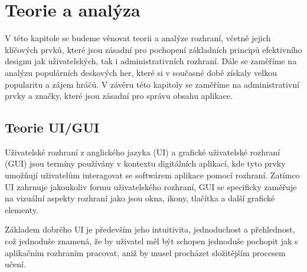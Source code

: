 \chapter{Teorie a analýza}
\label{ch:theory_and_analysis}
V této kapitole se budeme věnovat teorii a analýze rozhraní, včetně jejich klíčových prvků, které jsou zásadní pro pochopení základních principů efektivního designu jak uživatelských, tak i administrativních rozhraní. Dále se zaměříme na analýzu populárních deskových her, které si v současné době získaly velkou popularitu a zájem hráčů. V závěru této kapitoly se zaměříme na administrativní prvky a značky, které jsou zásadní pro správu obsahu aplikace.

\section{Teorie UI/GUI}
\label{sec:ui-gui-theory}
Uživatelské rozhraní z anglického jazyka \textit{} (UI) a grafické uživatelské rozhraní \textit{} (GUI) jsou termíny používány v kontextu digitálních aplikací, kde tyto prvky umožňují uživatelům interagovat se softwárem aplikace pomocí rozhraní. Zatímco UI zahrnuje jakoukoliv formu uživatelského rozhraní, GUI se specificky zaměřuje na vizuální aspekty rozhraní jako jsou okna, ikony, tlačítka a další grafické elementy.

Základem dobrého UI je především jeho intuitivita, jednoduchost a přehlednost, což jednoduše znamená, že by uživatel měl být schopen jednoduše pochopit jak s aplikačním rozhraním pracovat, aniž by musel procházet složitějším procesem učení.


